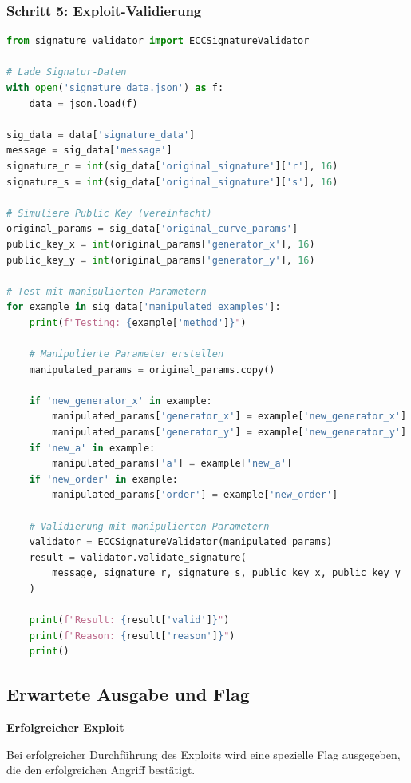 \documentclass{article}
\begin{document}
\subsubsection{Schritt 5: Exploit-Validierung}

\begin{lstlisting}[language=python, caption=Vollständiger Exploit]
from signature_validator import ECCSignatureValidator

# Lade Signatur-Daten
with open('signature_data.json') as f:
    data = json.load(f)

sig_data = data['signature_data']
message = sig_data['message']
signature_r = int(sig_data['original_signature']['r'], 16)
signature_s = int(sig_data['original_signature']['s'], 16)

# Simuliere Public Key (vereinfacht)
original_params = sig_data['original_curve_params']
public_key_x = int(original_params['generator_x'], 16)
public_key_y = int(original_params['generator_y'], 16)

# Test mit manipulierten Parametern
for example in sig_data['manipulated_examples']:
    print(f"Testing: {example['method']}")
    
    # Manipulierte Parameter erstellen
    manipulated_params = original_params.copy()
    
    if 'new_generator_x' in example:
        manipulated_params['generator_x'] = example['new_generator_x']
        manipulated_params['generator_y'] = example['new_generator_y']
    if 'new_a' in example:
        manipulated_params['a'] = example['new_a']
    if 'new_order' in example:
        manipulated_params['order'] = example['new_order']
    
    # Validierung mit manipulierten Parametern
    validator = ECCSignatureValidator(manipulated_params)
    result = validator.validate_signature(
        message, signature_r, signature_s, public_key_x, public_key_y
    )
    
    print(f"Result: {result['valid']}")
    print(f"Reason: {result['reason']}")
    print()
\end{lstlisting}

\subsection{Erwartete Ausgabe und Flag}

\begin{solutionbox}
\textbf{Erfolgreicher Exploit}

Bei erfolgreicher Durchführung des Exploits wird eine spezielle Flag ausgegeben, die den erfolgreichen Angriff bestätigt.
\end{solutionbox}
\end{document}
